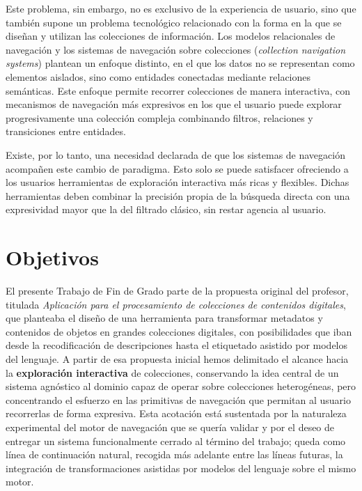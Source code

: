 Este problema, sin embargo, no es exclusivo de la experiencia de usuario, sino que también supone un problema tecnológico
relacionado con la forma en la que se diseñan y utilizan las colecciones de información.
Los modelos relacionales de navegación y los sistemas de navegación sobre colecciones
(\textit{collection navigation systems}) plantean un enfoque distinto, en el que los datos no se
representan como elementos aislados, sino como entidades conectadas mediante relaciones semánticas.
Este enfoque permite recorrer colecciones de manera interactiva, con mecanismos de navegación más expresivos
en los que el usuario puede explorar progresivamente una colección compleja combinando filtros, relaciones y
transiciones entre entidades.

Existe, por lo tanto, una necesidad declarada de que los sistemas de navegación acompañen este cambio de paradigma.
Esto solo se puede satisfacer ofreciendo a los usuarios herramientas de exploración interactiva más ricas y flexibles.
Dichas herramientas deben combinar la precisión propia de la búsqueda directa con una expresividad mayor
que la del filtrado clásico, sin restar agencia al usuario.

\section{Objetivos}
\label{sec:objetivos}

El presente Trabajo de Fin de Grado parte de la propuesta original del profesor, titulada
\textit{Aplicación para el procesamiento de colecciones de contenidos digitales}, que planteaba
el diseño de una herramienta para transformar metadatos y contenidos de objetos en grandes
colecciones digitales, con posibilidades que iban desde la recodificación de descripciones hasta
el etiquetado asistido por modelos del lenguaje. A partir de esa propuesta inicial hemos
delimitado el alcance hacia la \textbf{exploración interactiva} de colecciones, conservando la
idea central de un sistema agnóstico al dominio capaz de operar sobre colecciones heterogéneas,
pero concentrando el esfuerzo en las primitivas de navegación que permitan al usuario recorrerlas
de forma expresiva. Esta acotación está sustentada por la naturaleza experimental del motor de
navegación que se quería validar y por el deseo de entregar un sistema funcionalmente cerrado al
término del trabajo; queda como línea de continuación natural, recogida más adelante entre las
líneas futuras, la integración de transformaciones asistidas por modelos del lenguaje sobre el
mismo motor.

